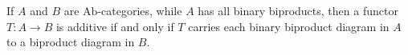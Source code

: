 If $A$ and $B$ are $\text{Ab}$-categories, while $A$ has all binary biproducts, then a functor $T : A \rightarrow B$ is additive if and only if $T$ carries each binary biproduct diagram in $A$ to a biproduct diagram in $B$.
